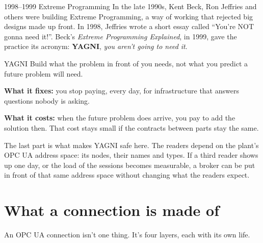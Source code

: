 \begin{history}{1998--1999 \textperiodcentered{} Extreme Programming}
In the late 1990s, Kent Beck, Ron Jeffries and others were building Extreme
Programming, a way of working that rejected big designs made up front. In 1998,
Jeffries wrote a short essay called ``You're NOT gonna need it!''. Beck's
\emph{Extreme Programming Explained}, in 1999, gave the practice its acronym:
\textbf{YAGNI}, \emph{you aren't going to need it}.
\end{history}

\begin{concept}{YAGNI}
Build what the problem in front of you needs, not what you predict a future
problem will need.

\textbf{What it fixes:} you stop paying, every day, for infrastructure that
answers questions nobody is asking.

\textbf{What it costs:} when the future problem does arrive, you pay to add the
solution then. That cost stays small if the contracts between parts stay the
same.
\end{concept}

The last part is what makes YAGNI safe here. The readers depend on the plant's
OPC UA address space: its nodes, their names and types. If a third reader shows
up one day, or the load of the sessions becomes measurable, a broker can be put
in front of that same address space without changing what the readers expect.

\section{What a connection is made of}

An OPC UA connection isn't one thing. It's four layers, each with its own life.

